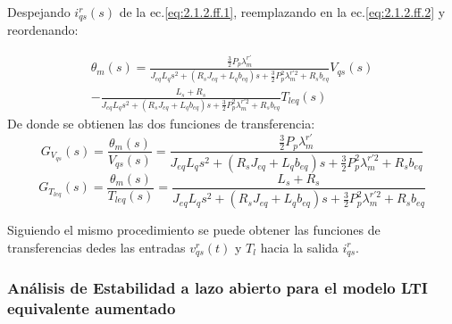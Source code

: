 \documentclass[10pt]{article}
\begin{document}
\begin{enumerate}
Despejando $i^{r}_{qs}(s)$ de la ec.\ref{eq:2.1.2.ff.1}, reemplazando en la ec.\ref{eq:2.1.2.ff.2} y reordenando:

\begin{eqnarray}
	\theta_{m}(s)=\frac{\frac{3}{2}P_{p}\lambda^{r'}_{m}}{J_{eq}L_{q}s^{2}+(R_{s}J_{eq}+L_{q}b_{eq})s + \frac{3}{2}P_{p}^{2}\lambda ^{r'2}_{m}+R_{s}b_{eq}} V_{qs}(s) \nonumber\\
	- \frac{L_{s}+R_{s}}{J_{eq}L_{q}s^{2}+(R_{s}J_{eq}+L_{q}b_{eq})s + \frac{3}{2}P_{p}^{2}\lambda ^{r'2}_{m}+R_{s}b_{eq}} T_{leq}(s)
	\label{eq:2.1.2.ff.3}
	\end{eqnarray}
De donde se obtienen las dos funciones de transferencia:
\begin{equation}
	G_{V_{qs}}(s)=\frac{\theta_{m}(s)}{V_{qs}(s)}=\frac{\frac{3}{2}P_{p}\lambda^{r'}_{m}}{J_{eq}L_{q}s^{2}+(R_{s}J_{eq}+L_{q}b_{eq})s + \frac{3}{2}P_{p}^{2}\lambda ^{r'2}_{m}+R_{s}b_{eq}}
	\label{eq:2.1.2.ff.4}
	\end{equation}
	\begin{equation}
	G_{T_{leq}}(s)=\frac{\theta_{m}(s)}{T_{leq}(s)}=\frac{L_{s}+R_{s}}{J_{eq}L_{q}s^{2}+(R_{s}J_{eq}+L_{q}b_{eq})s + \frac{3}{2}P_{p}^{2}\lambda ^{r'2}_{m}+R_{s}b_{eq}}
	\label{eq:2.1.2.ff.5}
	\end{equation} 
\end{enumerate}

Siguiendo el mismo procedimiento se puede obtener las funciones de transferencias dedes las entradas $v^{r}_{qs}(t)$ y $T_{l}$ hacia la salida $i^{r}_{qs}$.\\


\subsubsection{Análisis de Estabilidad a lazo abierto para el modelo LTI equivalente aumentado}
\end{document}
